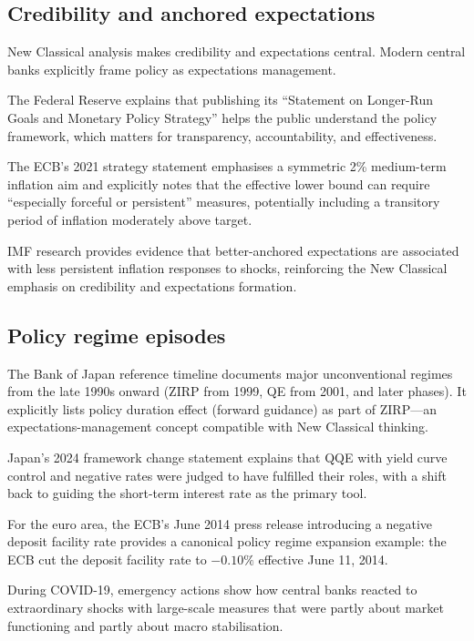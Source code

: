 \documentclass[
  letterpaper,
  DIV=11,
  numbers=noendperiod]{scrartcl}
\begin{document}
\subsection{Credibility and anchored
expectations}\label{credibility-and-anchored-expectations}

New Classical analysis makes credibility and expectations central.
Modern central banks explicitly frame policy as expectations management.

The Federal Reserve explains that publishing its ``Statement on
Longer-Run Goals and Monetary Policy Strategy'' helps the public
understand the policy framework, which matters for transparency,
accountability, and effectiveness.

The ECB's 2021 strategy statement emphasises a symmetric 2\% medium-term
inflation aim and explicitly notes that the effective lower bound can
require ``especially forceful or persistent'' measures, potentially
including a transitory period of inflation moderately above target.

IMF research provides evidence that better-anchored expectations are
associated with less persistent inflation responses to shocks,
reinforcing the New Classical emphasis on credibility and expectations
formation.

\subsection{Policy regime episodes}\label{policy-regime-episodes-1}

The Bank of Japan reference timeline documents major unconventional
regimes from the late 1990s onward (ZIRP from 1999, QE from 2001, and
later phases). It explicitly lists policy duration effect (forward
guidance) as part of ZIRP---an expectations-management concept
compatible with New Classical thinking.

Japan's 2024 framework change statement explains that QQE with yield
curve control and negative rates were judged to have fulfilled their
roles, with a shift back to guiding the short-term interest rate as the
primary tool.

For the euro area, the ECB's June 2014 press release introducing a
negative deposit facility rate provides a canonical policy regime
expansion example: the ECB cut the deposit facility rate to \(-0.10\%\)
effective June 11, 2014.

During COVID-19, emergency actions show how central banks reacted to
extraordinary shocks with large-scale measures that were partly about
market functioning and partly about macro stabilisation.
\end{document}
